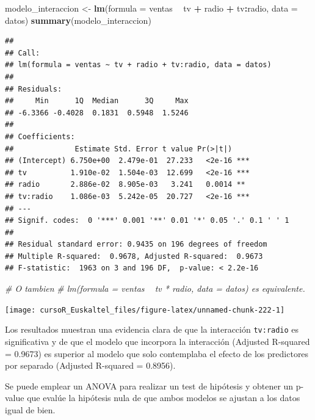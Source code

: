 \documentclass[]{book}
\newenvironment{Shaded}{\begin{snugshade}}{\end{snugshade}}
\newcommand{\KeywordTok}[1]{\textcolor[rgb]{0.13,0.29,0.53}{\textbf{#1}}}
\newcommand{\DataTypeTok}[1]{\textcolor[rgb]{0.13,0.29,0.53}{#1}}
\newcommand{\StringTok}[1]{\textcolor[rgb]{0.31,0.60,0.02}{#1}}
\newcommand{\CommentTok}[1]{\textcolor[rgb]{0.56,0.35,0.01}{\textit{#1}}}
\newcommand{\OperatorTok}[1]{\textcolor[rgb]{0.81,0.36,0.00}{\textbf{#1}}}
\newcommand{\NormalTok}[1]{#1}
\begin{document}
\begin{Shaded}
\begin{Highlighting}[]
\NormalTok{modelo_interaccion <-}\StringTok{ }\KeywordTok{lm}\NormalTok{(}\DataTypeTok{formula =}\NormalTok{ ventas }\OperatorTok{~}\StringTok{ }\NormalTok{tv }\OperatorTok{+}\StringTok{ }\NormalTok{radio }\OperatorTok{+}\StringTok{ }\NormalTok{tv}\OperatorTok{:}\NormalTok{radio, }\DataTypeTok{data =}\NormalTok{ datos)}
\KeywordTok{summary}\NormalTok{(modelo_interaccion)}
\end{Highlighting}
\end{Shaded}

\begin{verbatim}
## 
## Call:
## lm(formula = ventas ~ tv + radio + tv:radio, data = datos)
## 
## Residuals:
##     Min      1Q  Median      3Q     Max 
## -6.3366 -0.4028  0.1831  0.5948  1.5246 
## 
## Coefficients:
##              Estimate Std. Error t value Pr(>|t|)    
## (Intercept) 6.750e+00  2.479e-01  27.233   <2e-16 ***
## tv          1.910e-02  1.504e-03  12.699   <2e-16 ***
## radio       2.886e-02  8.905e-03   3.241   0.0014 ** 
## tv:radio    1.086e-03  5.242e-05  20.727   <2e-16 ***
## ---
## Signif. codes:  0 '***' 0.001 '**' 0.01 '*' 0.05 '.' 0.1 ' ' 1
## 
## Residual standard error: 0.9435 on 196 degrees of freedom
## Multiple R-squared:  0.9678, Adjusted R-squared:  0.9673 
## F-statistic:  1963 on 3 and 196 DF,  p-value: < 2.2e-16
\end{verbatim}

\begin{Shaded}
\begin{Highlighting}[]
\CommentTok{# O tambien}
\CommentTok{# lm(formula = ventas ~ tv * radio, data = datos) es equivalente.}
\end{Highlighting}
\end{Shaded}

\begin{center}\texttt{[image: cursoR\_Euskaltel\_files/figure-latex/unnamed-chunk-222-1]} \end{center}

Los resultados muestran una evidencia clara de que la interacción
\texttt{tv:radio} es significativa y de que el modelo que incorpora la
interacción (Adjusted R-squared = 0.9673) es superior al modelo que solo
contemplaba el efecto de los predictores por separado (Adjusted
R-squared = 0.8956).

Se puede emplear un ANOVA para realizar un test de hipótesis y obtener
un p-value que evalúe la hipótesis nula de que ambos modelos se ajustan
a los datos igual de bien.
\end{document}
